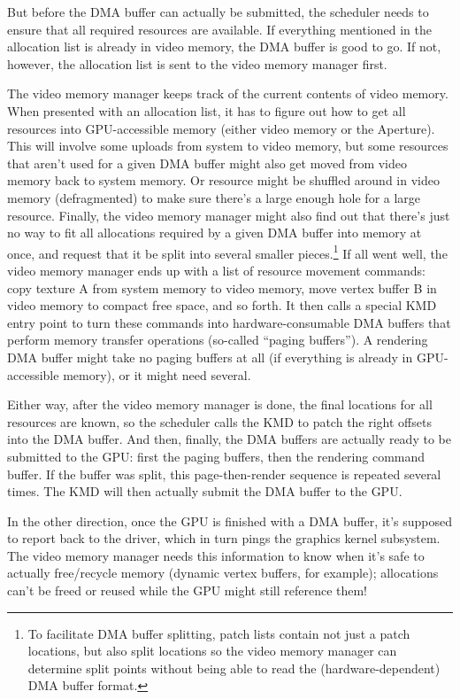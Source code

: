 But before the DMA buffer can actually be submitted, the scheduler needs to 
ensure that all required resources are available. If everything mentioned in 
the allocation list is already in video memory, the DMA buffer is good to go.  
If not, however, the allocation list is sent to the video memory manager first.

The video memory manager keeps track of the current contents of video memory.  
When presented with an allocation list, it has to figure out how to get all 
resources into GPU-accessible memory (either video memory or the Aperture).  
This will involve some uploads from system to video memory, but some resources 
that aren't used for a given DMA buffer might also get moved from video memory 
back to system memory. Or resource might be shuffled around in video memory 
(defragmented) to make sure there's a large enough hole for a large resource.  
Finally, the video memory manager might also find out that there's just no way 
to fit all allocations required by a given DMA buffer into memory at once, and 
request that it be split into several smaller pieces.\footnote{To facilitate 
DMA buffer splitting, patch lists contain not just a patch locations, but also 
split locations so the video memory manager can determine split points without 
being able to read the (hardware-dependent) DMA buffer format.} If all went 
well, the video memory manager ends up with a list of resource movement 
commands: copy texture A from system memory to video memory, move vertex buffer 
B in video memory to compact free space, and so forth. It then calls a special 
KMD entry point to turn these commands into hardware-consumable DMA buffers 
that perform memory transfer operations (so-called ``paging buffers'').  
A rendering DMA buffer might take no paging buffers at all (if everything is 
already in GPU-accessible memory), or it might need several.

Either way, after the video memory manager is done, the final locations for all 
resources are known, so the scheduler calls the KMD to patch the right offsets 
into the DMA buffer. And then, finally, the DMA buffers are actually ready to 
be submitted to the GPU: first the paging buffers, then the rendering command 
buffer. If the buffer was split, this page-then-render sequence is repeated 
several times. The KMD will then actually submit the DMA buffer to the GPU.

In the other direction, once the GPU is finished with a DMA buffer, it's 
supposed to report back to the driver, which in turn pings the graphics kernel 
subsystem. The video memory manager needs this information to know when it's 
safe to actually free/recycle memory (dynamic vertex buffers, for example); 
allocations can't be freed or reused while the GPU might still reference them!
 
